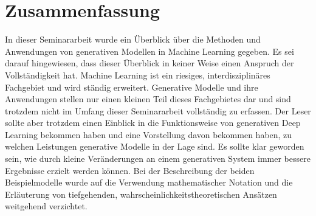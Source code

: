 \section{Zusammenfassung}\label{Zusammenfassung}

In dieser Seminararbeit wurde ein Überblick über die Methoden und Anwendungen von generativen Modellen in Machine Learning gegeben. Es sei darauf hingewiesen, dass dieser Überblick in keiner Weise einen Anspruch der Vollständigkeit hat. Machine Learning ist ein riesiges, interdisziplinäres Fachgebiet und wird ständig erweitert.
Generative Modelle und ihre Anwendungen stellen nur einen kleinen Teil dieses Fachgebietes dar und sind trotzdem nicht im Umfang dieser Seminararbeit vollständig zu erfassen. Der Leser sollte aber trotzdem einen Einblick in die Funktionsweise von generativen Deep Learning bekommen haben und eine Vorstellung davon bekommen haben, zu welchen Leistungen generative Modelle in der Lage sind. Es sollte klar geworden sein, wie durch kleine Veränderungen an einem generativen System immer bessere Ergebnisse erzielt werden können. Bei der Beschreibung der beiden Beispielmodelle wurde auf die Verwendung mathematischer Notation und die Erläuterung von tiefgehenden, wahrscheinlichkeitstheoretischen Ansätzen weitgehend verzichtet.

